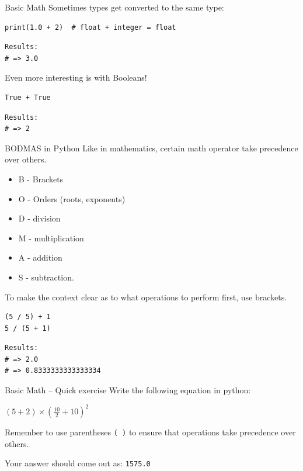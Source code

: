 \documentclass[10pt]{beamer}
\begin{document}
\begin{frame}[label={sec:org8241622},fragile]{Basic Math}
 Sometimes types get converted to the same type:

\begin{verbatim}
print(1.0 + 2)  # float + integer = float
\end{verbatim}

\begin{verbatim}
Results: 
# => 3.0
\end{verbatim}


Even more interesting is with Booleans!

\begin{verbatim}
True + True
\end{verbatim}

\begin{verbatim}
Results: 
# => 2
\end{verbatim}
\end{frame}

\begin{frame}[label={sec:org2f77011},fragile]{BODMAS in Python}
 Like in mathematics, certain math operator take precedence over others.

\begin{itemize}
\item B - Brackets
\item O - Orders (roots, exponents)
\item D - division
\item M - multiplication
\item A - addition
\item S - subtraction.
\end{itemize}

To make the context clear as to what operations to perform first, use brackets.

\begin{verbatim}
(5 / 5) + 1
5 / (5 + 1)
\end{verbatim}

\begin{verbatim}
Results: 
# => 2.0
# => 0.8333333333333334
\end{verbatim}
\end{frame}

\begin{frame}[label={sec:orgc9196ab},fragile]{Basic Math -- Quick exercise}
 Write the following equation in python:

\((5 + 2) \times (\frac{10}{2} + 10)^2\)

\alert{Remember} to use parentheses \texttt{( )} to ensure that operations take precedence over
others.

Your answer should come out as: \texttt{1575.0}
\end{frame}
\end{document}
